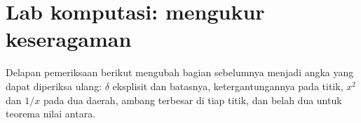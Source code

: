 
\section{Lab komputasi: mengukur keseragaman}

Delapan pemeriksaan berikut mengubah bagian sebelumnya menjadi angka yang dapat
diperiksa ulang: $\delta$ eksplisit dan batasnya, ketergantungannya pada titik,
$x^{2}$ dan $1/x$ pada dua daerah, ambang terbesar di tiap titik, dan belah dua untuk
teorema nilai antara.


